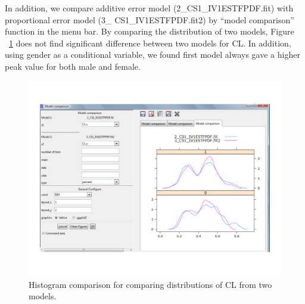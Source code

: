 \documentclass[a4paper]{article}
\begin{document}
\newline
\newline
In addition, we compare additive error model (2\_CS1\_IV1ESTFPDF.fit) with proportional error model (3\_ CS1\_IV1ESTFPDF.fit2) by ``model comparison'' function in the menu bar. By comparing the distribution of two models, Figure ~\ref{c4_s2_9} does not find significant difference between two models for CL. In addition, using gender as a conditional variable, we found first model always gave a higher peak value for both male and female.
\begin{figure}[h!tb]
\centering
\includegraphics[scale=0.6]{modelcc2.pdf}
\caption{Histogram comparison for
comparing distributions of CL from two models.}
\label{c4_s2_9}
\end{figure}
\end{document}
